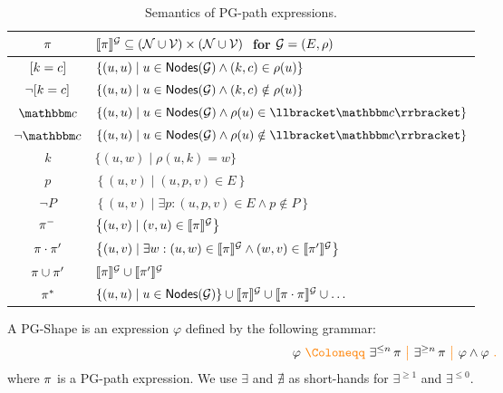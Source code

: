 \begin{table}[tb]
  \caption{Semantics of PG-path expressions.}
  \label{tab:semPGtypes}  
  \centering
  \begin{tabular}{cl}
    \toprule
    $\pi$ & $\llbracket{\pi}\rrbracket^{\mathcal{G}}\subseteq (\mathcal{N}\cup\mathcal{V})\times (\mathcal{N}\cup\mathcal{V})\ $  for  $\mathcal{G} = (E, \rho)$ \\[2pt]
    \midrule    
    $[{k}={c}]$ & $\left\{ (u, u) \mid u \in \mathsf{Nodes}(\mathcal{G}) \land (k,c) \in \rho(u) \right\}$ \\[2pt]
        $\neg [{k}={c}]$ & $\left\{ (u, u) \mid u \in \mathsf{Nodes}(\mathcal{G}) \land (k,c) \notin \rho(u) \right\}$ \\[2pt]
    $\ntype$ & $\left\{ (u, u) \mid u\in\nodes(\graph)\land \rho(u) \in \sem{\ntype} \right\}$ \\[2pt]
    $\lnot \ntype$ & $\left\{ (u, u) \mid u \in \nodes(\graph)\land \rho(u)\notin \sem{\ntype} \right\}$ \\[2pt]
    $k$ & $\{(u,w)\mid \rho(u,k)=w\}$ \\[2pt]
    $p$ & $\left\{ (u, v) \mid (u, p, v) \in E \right\}$  \\[2pt]
    $\lnot P$ & $\left\{ (u, v) \mid \exists p : (u, p, v) \in E \wedge p \notin P \right\}$ \\[2pt]
    $\pi^{-}$ & $\left\{(u,v)\mid (v,u) \in \llbracket \pi \rrbracket^{\mathcal{G}}\right\}$ \\[2pt]
    $\pi \cdot \pi'$ & $\left\{(u,v) \mid \exists w: (u,w)\in\llbracket \pi \rrbracket^{\mathcal{G}}\land (w,v)\in\llbracket \pi' \rrbracket^{\mathcal{G}}\right\}$ \\[2pt]
    $\pi\cup \pi'$ & $\llbracket \pi \rrbracket^{\mathcal{G}}\cup\llbracket \pi' \rrbracket^{\mathcal{G}}$\\[2pt]
   $\pi^{*}$ & $ \{(u,u)\mid u\in\mathsf{Nodes}(\mathcal{G})\}\cup \llbracket \pi \rrbracket^{\mathcal{G}}  \cup \llbracket \pi \cdot \pi \rrbracket^{\mathcal{G}} \cup \ldots $ \\
    \bottomrule
  \end{tabular}
\end{table}


\begin{definition}[PG-Shapes]
A PG-Shape is an expression $\varphi$ defined by the following grammar:
\[ 
\varphi \gDef \exists ^{\leq n} \, \pexpr \gMid \exists^{\geq n} \,\pexpr \gMid \varphi \land \varphi \gEnd
\]
where $\pi$ is a PG-path expression. We use $\exists$ and $\nexists$ as short-hands for $\exists^{\geq 1}$ and $\exists^{\leq 0}$.
\end{definition}


